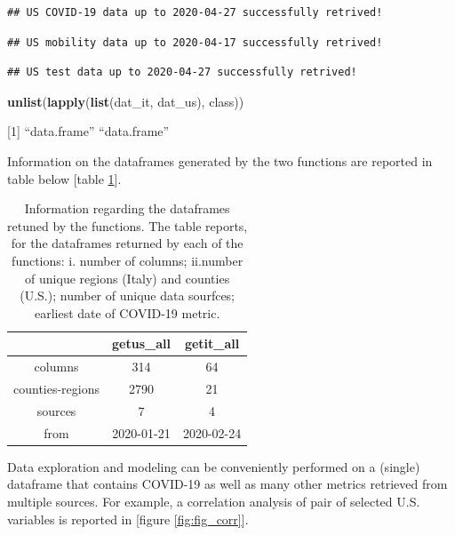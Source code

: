 \documentclass[12pt,halfline,a4paper,]{ouparticle}
\newenvironment{Shaded}{\begin{snugshade}}{\end{snugshade}}
\newcommand{\KeywordTok}[1]{\textcolor[rgb]{0.13,0.29,0.53}{\textbf{#1}}}
\newcommand{\NormalTok}[1]{#1}
\begin{document}
\begin{verbatim}
## US COVID-19 data up to 2020-04-27 successfully retrived!
\end{verbatim}

\begin{verbatim}
## US mobility data up to 2020-04-17 successfully retrived!
\end{verbatim}

\begin{verbatim}
## US test data up to 2020-04-27 successfully retrived!
\end{verbatim}

\begin{Shaded}
\begin{Highlighting}[]
\KeywordTok{unlist}\NormalTok{(}\KeywordTok{lapply}\NormalTok{(}\KeywordTok{list}\NormalTok{(dat_it, dat_us), class))}
\end{Highlighting}
\end{Shaded}

{[}1{]} ``data.frame'' ``data.frame''

\bigskip

Information on the dataframes generated by the two functions are
reported in table below {[}table \ref{tab:tab_dat}{]}.

\bigskip

\begin{table}[ht]
\centering
\begin{tabular}{ccc}
  \hline
 & getus\_all & getit\_all \\ 
  \hline
columns & 314 & 64 \\ 
  counties-regions & 2790 & 21 \\ 
  sources & 7 & 4 \\ 
  from & 2020-01-21 & 2020-02-24 \\ 
   \hline
\end{tabular}
\caption{Information regarding the dataframes retuned by the functions.
    The table reports, for the dataframes returned by each of the functions: i. number of columns; ii.number of unique regions (Italy) and counties (U.S.);  number of unique data sourfces; earliest date of COVID-19 metric.
    } 
\label{tab:tab_dat}
\end{table}

Data exploration and modeling can be conveniently performed on a
(single) dataframe that contains COVID-19 as well as many other metrics
retrieved from multiple sources. For example, a correlation analysis of
pair of selected U.S. variables is reported in {[}figure
\ref{fig:fig_corr}{]}.
\end{document}

